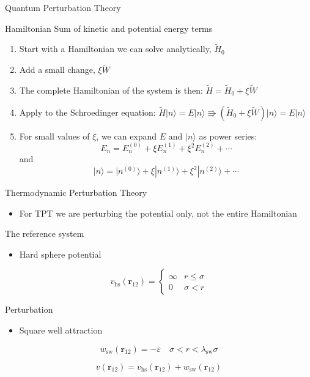 \documentclass[xcolor=dvipsnames]{beamer}
\newcommand{\lambdaSW}{\ensuremath{\lambda_\text{sw}}}
\newcommand{\III}{\ensuremath{\textbf{r}_{12}}} %
\newcommand{\Wtilde}{\ensuremath{\widetilde{W}}}
\begin{document}
\begin{frame}{Quantum Perturbation Theory}
  \begin{block}{Hamiltonian}
    Sum of kinetic and potential energy terms
  \end{block}
  \begin{enumerate}
    \item Start with a Hamiltonian we can solve analytically, $\widetilde{H}_0$
    \item Add a small change, $\xi \Wtilde$
    \item The complete Hamiltonian of the system is then: $ \widetilde{H} = \widetilde{H}_0 + \xi \Wtilde $
    \item Apply to the Schroedinger equation: $ \widetilde{H}|n\rangle = E|n\rangle \Rrightarrow (\widetilde{H}_0 + \xi \Wtilde)|n\rangle = E|n\rangle $
    \item For small values of $\xi$, we can expand $E$ and $|n\rangle$ as power series: \[ E_n = E_n^{(0)} + \xi E_n^{(1)} + \xi^2E_n^{(2)} + \cdots \] and \[ |n\rangle = |n^{(0)}\rangle + \xi|n^{(1)}\rangle + \xi^2|n^{(2)}\rangle + \cdots \]
  \end{enumerate}
\end{frame}

\begin{frame}{Thermodynamic Perturbation Theory}
  \begin{itemize}
    \item For TPT we are perturbing the potential only, not the entire Hamiltonian
  \end{itemize}

  \begin{block}{The reference system}
    \begin{itemize}
      \item Hard sphere potential
    \end{itemize}
    \[
      v_\text{hs}(\III) =
      \begin{cases}
        \infty & r \leq \sigma \\
        0 & \sigma < r
      \end{cases}
    \]
  \end{block}

  \begin{block}{Perturbation}
    \begin{itemize}
      \item Square well attraction
    \end{itemize}
    \[
      w_\text{sw}(\III) = - \varepsilon \quad  \sigma < r < \lambdaSW\sigma
    \]
  \end{block}

  \begin{block}{}
  \[ v(\III) = v_\text{hs}(\III) + w_\text{sw}(\III) \]
  \end{block}
\end{frame}
\end{document}
